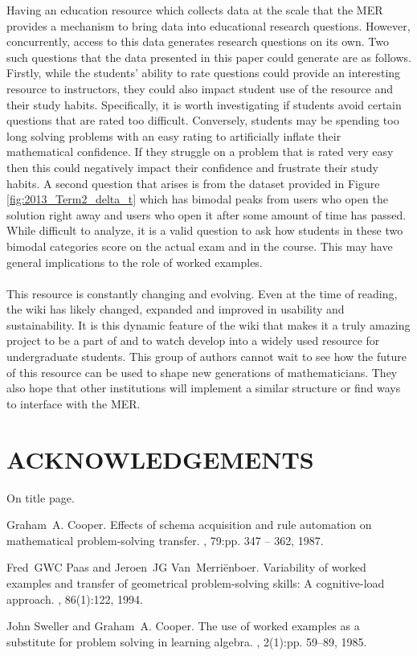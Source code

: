 \documentclass{primus}
\begin{document}
\noindent{}Having an education resource which collects data at the scale that the MER provides a mechanism to bring data into educational research questions. However, concurrently, access to this data generates research questions on its own. Two such questions that the data presented in this paper could generate are as follows. Firstly, while the students’ ability to rate questions could provide an interesting resource to instructors, they could also impact student use of the resource and their study habits. Specifically, it is worth investigating if students avoid certain questions that are rated too difficult. Conversely, students may be spending too long solving problems with an easy rating to artificially inflate their mathematical confidence. If they struggle on a problem that is rated very easy then this could negatively impact their confidence and frustrate their study habits. A second question that arises is from the dataset provided in Figure \ref{fig:2013_Term2_delta_t} which has bimodal peaks from users who open the solution right away and users who open it after some amount of time has passed. While difficult to analyze, it is a valid question to ask how students in these two bimodal categories score on the actual exam and in the course. This may have general implications to the role of worked examples.
\\\\
\noindent{}This resource is constantly changing and evolving. Even at the time of reading, the wiki has likely changed, expanded and improved in usability and sustainability. It is this dynamic feature of the wiki that makes it a truly amazing project to be a part of and to watch develop into a widely used resource for undergraduate students. This group of authors cannot wait to see how the future of this resource can be used to shape new generations of mathematicians. They also hope that other institutions will implement a similar structure or find ways to interface with the MER.

\section{ACKNOWLEDGEMENTS}\label{sec:Acknowledgements}
On title page.


\begin{thebibliography}{1}

Graham~A. Cooper.
\newblock Effects of schema acquisition and rule automation on mathematical
problem-solving transfer.
, 79:pp. 347 -- 362, 1987.

Fred~GWC Paas and Jeroen~JG Van~Merri{\"e}nboer.
\newblock Variability of worked examples and transfer of geometrical
problem-solving skills: A cognitive-load approach.
, 86(1):122, 1994.

John Sweller and Graham~A. Cooper.
\newblock The use of worked examples as a substitute for problem solving in
learning algebra.
, 2(1):pp. 59--89, 1985.

\end{thebibliography}
\end{document}
